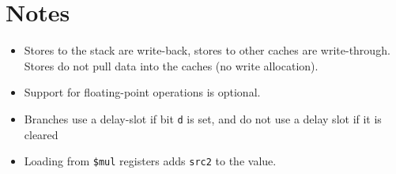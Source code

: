 \documentclass[10pt,DIV12]{scrartcl}
\begin{document}
\section{Notes}

\begin{itemize}
\item Stores to the stack are write-back, stores to other caches are
  write-through. Stores do not pull data into the caches (no write allocation).
\item Support for floating-point operations is optional.
\item Branches use a delay-slot if bit \texttt{d} is set, and do not use a delay slot if it is cleared
\item Loading from \texttt{\$mul} registers adds \texttt{src2} to the value.
\end{itemize}
\end{document}
